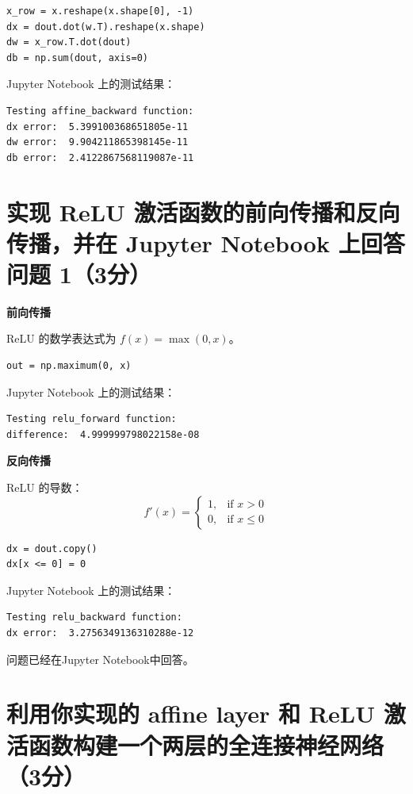 \begin{lstlisting}[style=cleanpython]
x_row = x.reshape(x.shape[0], -1)
dx = dout.dot(w.T).reshape(x.shape)
dw = x_row.T.dot(dout)
db = np.sum(dout, axis=0)
\end{lstlisting}

Jupyter Notebook 上的测试结果：

\begin{lstlisting}[style=cleanpython]
Testing affine_backward function:
dx error:  5.399100368651805e-11
dw error:  9.904211865398145e-11
db error:  2.4122867568119087e-11
\end{lstlisting}

\section{实现 ReLU 激活函数的前向传播和反向传播，并在 Jupyter Notebook 上回答问题 1（3分）}

\textbf{前向传播}

ReLU 的数学表达式为 $f(x) = \max(0, x)$。

\begin{lstlisting}[style=cleanpython]
out = np.maximum(0, x)
\end{lstlisting}

Jupyter Notebook 上的测试结果：

\begin{lstlisting}[style=cleanpython]
Testing relu_forward function:
difference:  4.999999798022158e-08
\end{lstlisting}

\textbf{反向传播}

ReLU 的导数：
$$f'(x) = \begin{cases}
1, & \text{if } x > 0 \\
0, & \text{if } x \leq 0
\end{cases}$$

\begin{lstlisting}[style=cleanpython]
dx = dout.copy()
dx[x <= 0] = 0
\end{lstlisting}

Jupyter Notebook 上的测试结果：

\begin{lstlisting}[style=cleanpython]
Testing relu_backward function:
dx error:  3.2756349136310288e-12
\end{lstlisting}

问题已经在Jupyter Notebook中回答。

\section{利用你实现的 affine layer 和 ReLU 激活函数构建一个两层的全连接神经网络（3分）}

